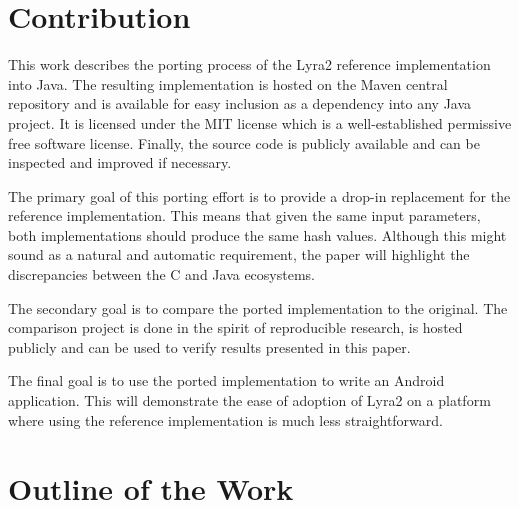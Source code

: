 \section{Contribution}
This work describes the porting process of the Lyra2 reference implementation into Java. The resulting implementation is hosted on the Maven central repository and is available for easy inclusion as a dependency into any Java project. It is licensed under the MIT license which is a well-established permissive free software license. Finally, the source code is publicly available and can be inspected and improved if necessary.

The primary goal of this porting effort is to provide a drop-in replacement for the reference implementation. This means that given the same input parameters, both implementations should produce the same hash values. Although this might sound as a natural and automatic requirement, the paper will highlight the discrepancies between the C and Java ecosystems.

The secondary goal is to compare the ported implementation to the original. The comparison project is done in the spirit of reproducible research, is hosted publicly and can be used to verify results presented in this paper.

The final goal is to use the ported implementation to write an Android application. This will demonstrate the ease of adoption of Lyra2 on a platform where using the reference implementation is much less straightforward.

\section{Outline of the Work}


